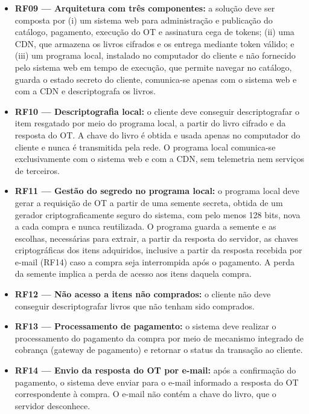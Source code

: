 \documentclass[12pt, oneside, a4paper, english, brazil]{abntex2}
\begin{document}
\begin{itemize}
\item \textbf{RF09 --- Arquitetura com três componentes:} a solução deve ser
composta por (i) um sistema web para administração e publicação do catálogo,
pagamento, execução do OT e assinatura cega de tokens; (ii) uma CDN, que
armazena os livros cifrados e os entrega mediante token válido; e (iii) um
programa local, instalado no computador do cliente e não fornecido pelo
sistema web em tempo de execução, que permite navegar no catálogo, guarda o
estado secreto do cliente, comunica-se apenas com o sistema web e com a CDN e
descriptografa os livros.

\item \textbf{RF10 --- Descriptografia local:} o cliente deve conseguir
descriptografar o item resgatado por meio do programa local, a partir do livro
cifrado e da resposta do OT. A chave do livro é obtida e usada apenas no
computador do cliente e nunca é transmitida pela rede. O programa local
comunica-se exclusivamente com o sistema web e com a CDN, sem telemetria nem
serviços de terceiros.

\item \textbf{RF11 --- Gestão do segredo no programa local:} o programa local
deve gerar a requisição de OT a partir de uma semente secreta, obtida de um
gerador criptograficamente seguro do sistema, com pelo menos 128 bits, nova a
cada compra e nunca reutilizada. O programa guarda a semente e as escolhas,
necessárias para extrair, a partir da resposta do servidor, as chaves
criptográficas dos itens adquiridos, inclusive a partir da resposta recebida
por e-mail (RF14) caso a compra seja interrompida após o pagamento. A perda da
semente implica a perda de acesso aos itens daquela compra.

\item \textbf{RF12 --- Não acesso a itens não comprados:} o cliente não deve
conseguir descriptografar livros que não tenham sido comprados.

\item \textbf{RF13 --- Processamento de pagamento:} o sistema deve realizar o
processamento do pagamento da compra por meio de mecanismo integrado de
cobrança (gateway de pagamento) e retornar o status da transação ao cliente.

\item \textbf{RF14 --- Envio da resposta do OT por e-mail:} após a confirmação
do pagamento, o sistema deve enviar para o e-mail informado a resposta do OT
correspondente à compra. O e-mail não contém a chave do livro, que o servidor
desconhece.


\end{itemize}
\end{document}
